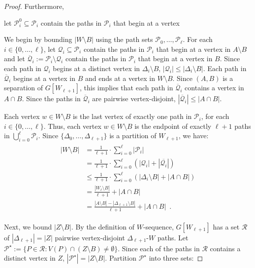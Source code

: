 \documentclass{patmorin}
\newcommand{\pat}[1]{\textcolor{Blue}{[Pat: #1]}}
\newcommand{\hussein}[1]{\textcolor{purple}{HH: #1}}
\begin{document}
\begin{proof}
  Furthermore,


  let $\mathcal{P}^{0}_i\subseteq \mathcal{P}_i$ contain the paths in $\mathcal{P}_i$ that begin at a vertex






  We begin by bounding $|W\setminus B|$ using the path sets $\mathcal{P}_0,\ldots,\mathcal{P}_{\ell}$.  For each $i\in\{0,\ldots,\ell\}$, let $\mathcal{Q}_i\subseteq \mathcal{P}_i$ contain the paths in $\mathcal{P}_i$ that begin at a vertex in $A\setminus B$ and let $\overline{\mathcal{Q}}_i:=\mathcal{P}_i\setminus \mathcal{Q}_i$ contain the paths in $\mathcal{P}_i$ that begin at a vertex in $B$.  Since each path in $\mathcal{Q}_i$ begins at a distinct vertex in $\Delta_i\setminus B$, $|\mathcal{Q}_i|\le|\Delta_i\setminus B|$. Each path in $\overline{\mathcal{Q}}_i$ begins at a vertex in $B$ and ends at a vertex in $W\setminus B$. Since $(A,B)$ is a separation of $G[W_{\ell+1}]$, this implies that each path in $\overline{\mathcal{Q}}_i$ contains a vertex in $A\cap B$.  Since the paths in $\overline{\mathcal{Q}}_i$ are pairwise vertex-disjoint, $|\overline{\mathcal{Q}}_i|\le |A\cap B|$.

  Each vertex $w\in W\setminus B$ is the last vertex of exactly one path in $\mathcal{P}_i$, for each $i\in\{0,\ldots,\ell\}$. Thus, each vertex $w\in W\setminus B$ is the endpoint of exactly $\ell+1$ paths in $\bigcup_{i=0}^\ell\mathcal{P}_i$.  Since $\{\Delta_0,\ldots,\Delta_{\ell+1}\}$ is a partition of $W_{\ell+1}$, we have:
  \begin{align}
  \begin{split}
    |W\setminus B|
      & = \frac{1}{\ell+1}\cdot\sum_{i=0}^{\ell}|\mathcal{P}_i| \\
      & = \frac{1}{\ell+1}\cdot\sum_{i=0}^{\ell}\left(|\mathcal{Q}_i|+|\overline{\mathcal{Q}_i}|\right) \\
      & \le \frac{1}{\ell+1}\cdot\sum_{i=0}^{\ell}\left(|\Delta_i\setminus B|+|A\cap B|\right) \\
      & = \frac{|W_\ell\setminus B|}{\ell+1} + |A\cap B| \\
      & = \frac{|A\setminus B|-|\Delta_{\ell+1}\setminus B|}{\ell+1} + |A\cap B| \enspace .  \label{w_b_bound}
  \end{split}
  \end{align}

Next, we bound $|Z\setminus B|$.  By the definition of $W$-sequence, $G[W_{\ell+1}]$ has a set $\mathcal{R}$ of $|\Delta_{\ell+1}|=|Z|$ pairwise vertex-disjoint $\Delta_{\ell+1}$-$W$ paths.  Let $\mathcal{P}^\star:=\{P\in\mathcal{R}: V(P)\cap (Z\setminus B)\neq\emptyset\}$.
Since each of the paths in $\mathcal{R}$ contains a distinct vertex in $Z$, $|\mathcal{P}^\star|=|Z\setminus B|$.  Partition $\mathcal{P}^\star$ into three sets:


\end{proof}
\end{document}
